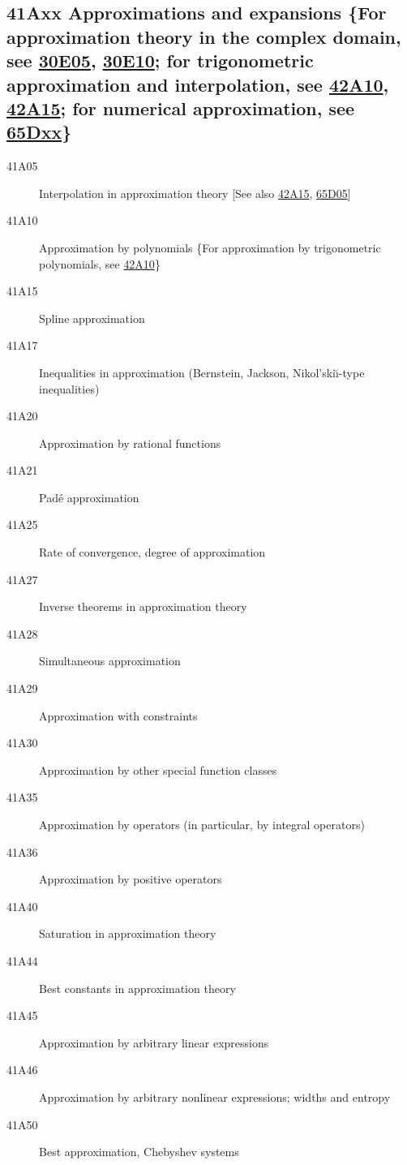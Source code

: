 \subsection*{41Axx  Approximations and expansions \{For approximation theory in the complex domain, see \hyperref[30E05]{30E05}, \hyperref[30E10]{30E10}; for trigonometric approximation and interpolation, see \hyperref[42A10]{42A10}, \hyperref[42A15]{42A15}; for numerical approximation, see \hyperref[65Dxx]{65Dxx}\} }\label{41Axx}
\begin{description}  
\item [41A05]\label{41A05} Interpolation in approximation theory [See also \hyperref[42A15]{42A15}, \hyperref[65D05]{65D05}]
\item [41A10]\label{41A10} Approximation by polynomials \{For approximation by trigonometric polynomials, see \hyperref[42A10]{42A10}\}
\item [41A15]\label{41A15} Spline approximation
\item [41A17]\label{41A17} Inequalities in approximation (Bernstein, Jackson, Nikol'ski\u{\i}-type inequalities)
\item [41A20]\label{41A20} Approximation by rational functions
\item [41A21]\label{41A21} Pad\'{e} approximation
\item [41A25]\label{41A25} Rate of convergence, degree of approximation
\item [41A27]\label{41A27} Inverse theorems in approximation theory
\item [41A28]\label{41A28} Simultaneous approximation
\item [41A29]\label{41A29} Approximation with constraints
\item [41A30]\label{41A30} Approximation by other special function classes
\item [41A35]\label{41A35} Approximation by operators (in particular, by integral operators)
\item [41A36]\label{41A36} Approximation by positive operators
\item [41A40]\label{41A40} Saturation in approximation theory
\item [41A44]\label{41A44} Best constants in approximation theory
\item [41A45]\label{41A45} Approximation by arbitrary linear expressions
\item [41A46]\label{41A46} Approximation by arbitrary nonlinear expressions; widths and entropy
\item [41A50]\label{41A50} Best approximation, Chebyshev systems

\end{description}
